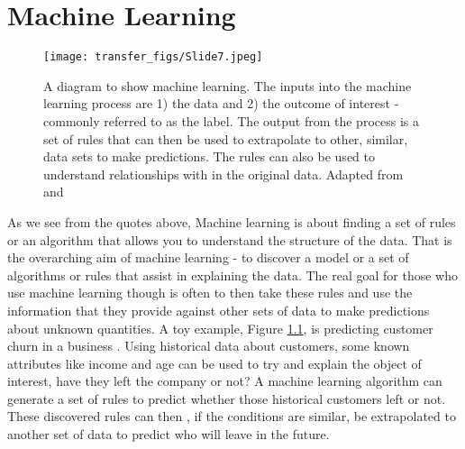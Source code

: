
\chapter{Machine Learning}

\begin{figure}
  \texttt{[image: transfer\_figs/Slide7.jpeg]}
  \caption[Machine learning diagram.]{A diagram to show machine learning. The inputs into the machine learning process are 1) the data and 2) the outcome of interest - commonly referred to as the label. The output from the process is a set of rules that can then be used to extrapolate to other, similar, data sets to make predictions. The rules can also be used to understand relationships with in the original data. Adapted from  \textcite{chollet_allaire_2018} and \textcite{provost2013data} }
  \label{fig:ML}
\end{figure}


 \parencite{spiegelhalter2019art}

 \parencite{chollet_allaire_2018}


As we see from the quotes above, Machine learning is about finding a set of rules or an algorithm that allows you to understand the structure of the data. That is the overarching aim of machine learning - to discover a model or a set of algorithms or rules that assist in explaining the data. The real goal for those who use machine learning though is often to then take these rules and use the information that they provide against other sets of data to make predictions about unknown quantities. A toy example, Figure \ref{fig:ML},  is predicting customer churn in a business \parencite{provost2013data}. Using historical data about customers, some known attributes like income and age can be used to try and explain the object of interest, have they left the company or not? A machine learning algorithm can generate a set of rules to predict whether those historical customers left or not. These discovered rules can then , if the conditions are similar, be extrapolated to another set of data to predict who will leave in the future.    


